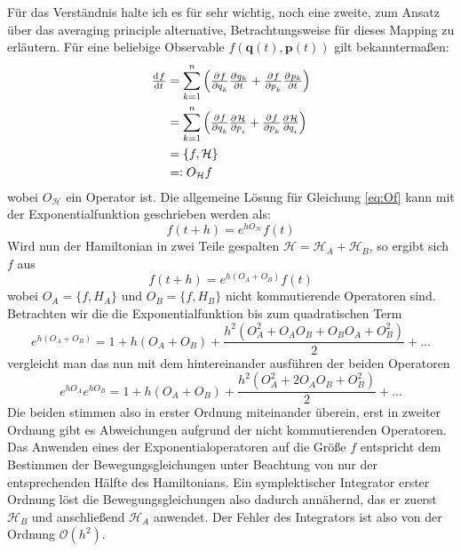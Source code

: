 \documentclass[12pt,a4paper,twoside]{article}
\renewcommand{\vec}{\mathbf}
\renewcommand{\H}{\mathcal H}
\begin{document}
Für das Verständnis halte ich es für sehr wichtig, noch eine zweite, zum Ansatz über das averaging principle alternative, Betrachtungsweise für dieses Mapping zu erläutern.
Für eine beliebige Observable $f(\vec q(t),\vec p(t))$ gilt bekanntermaßen:
\begin{align}
\od{f}{t} &= 
\sum_{k=1}^n \left(
	\pd{f}{q_k} \pd{q_k}{t} +
	\pd{f}{p_k} \pd{p_k}{t}
\right) \\ &=
\sum_{k=1}^n \left(
	\pd{f}{q_k} \pd{\H}{p_i} +
	\pd{f}{p_k} \pd{\H}{q_i}
\right) \\ &=
\lbrace f,\H \rbrace \\ &=:
O_\H f \label{eq:Of}
\end{align}
wobei $O_\H$ ein Operator ist. Die allgemeine Lösung für Gleichung \ref{eq:Of} kann mit der Exponentialfunktion geschrieben werden als:
\begin{equation}
f(t+h) = e^{hO_\H}f(t)
\end{equation}
Wird nun der Hamiltonian in zwei Teile gespalten $\H=\H_A+\H_B$, so ergibt sich $f$ aus
\begin{equation}
f(t+h)=e^{h\left(O_A+O_B\right)}f(t)
\end{equation}
wobei $O_A=\lbrace f, H_A \rbrace$ und $O_B=\lbrace f, H_B \rbrace$ nicht kommutierende Operatoren sind\cite{Chambers1999}. Betrachten wir die die Exponentialfunktion bis zum quadratischen Term
\begin{equation}
e^{h\left(O_A+O_B\right)} = 1 + h\left(O_A+O_B\right) + \frac{h^2\left(O_A^2+O_AO_B+O_BO_A+O_B^2\right)}{2} + ... \label{eq:OAB}
\end{equation} %
vergleicht man das nun mit dem hintereinander ausführen der beiden Operatoren
\begin{equation}
e^{hO_A}e^{hO_B} = 1 + h\left(O_A+O_B\right) + \frac{h^2\left(O_A^2+2O_AO_B+O_B^2\right)}{2} + ... \label{eq:OA+B}
\end{equation}
Die beiden stimmen also in erster Ordnung miteinander überein, erst in zweiter Ordnung gibt es Abweichungen aufgrund der nicht kommutierenden Operatoren\cite{Chambers1999}. Das Anwenden eines der Exponentialoperatoren auf die Größe $f$ entspricht dem Bestimmen der Bewegungsgleichungen unter Beachtung von nur der entsprechenden Hälfte des Hamiltonians.
Ein symplektischer Integrator erster Ordnung löst die Bewegungsgleichungen also dadurch annähernd, das er zuerst $\H_B$ und anschließend $\H_A$ anwendet.
Der Fehler des Integrators ist also von der Ordnung $\mathcal{O}(h^2)$.
\end{document}
